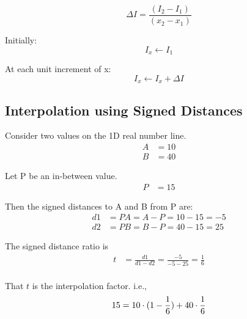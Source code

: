 \[ 
\Delta I = \frac{(I_2 - I_1)}{(x_2 - x_1)}
\]

Initially:
\[ 
I_x \leftarrow I_1
\]

At each unit increment of x:
\[ 
I_x \leftarrow I_x + \Delta I
\]
\subsection{Interpolation using Signed Distances}
Consider two values on the 1D  real number line.
\begin{align*}
A &= 10\\
B &= 40
\end{align*}

Let P be an in-between value.
\begin{align*}
P &= 15
\end{align*}

\begin{center}
\end{center}

Then the signed distances to A and B from P are:
\begin{align*}
d1 &= PA = A - P = 10 - 15 = -5\\
d2 &= PB = B - P = 40 - 15 = 25
\end{align*}

The signed distance ratio is
\begin{align*}
t &=  \frac{d1}{d1-d2} =  \frac{-5}{-5-25} = \frac{1}{6} \\
\end{align*}

That $t$ is the interpolation factor.
i.e.,
\[
15 = 10 \cdot (1 - \frac{1}{6}) + 40 \cdot \frac{1}{6}\\
\]


